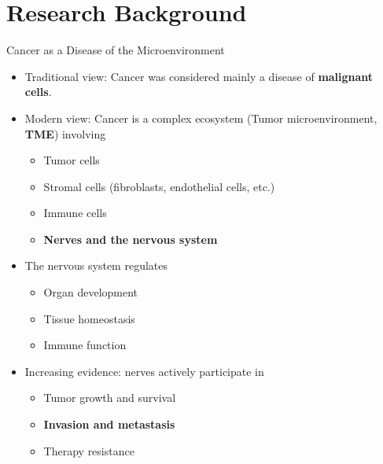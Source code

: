 \documentclass[10pt]{beamer}
\theoremstyle{plain}
\begin{document}
\section{Research Background}

\begin{frame}{Cancer as a Disease of the Microenvironment}
  \begin{itemize}
    \item Traditional view: Cancer was considered mainly a disease of \textbf{malignant cells}.
    \item Modern view: Cancer is a complex ecosystem (Tumor microenvironment, \textbf{TME}) involving
      \begin{itemize}
        \item Tumor cells
        \item Stromal cells (fibroblasts, endothelial cells, etc.)
        \item Immune cells
        \item \textbf{Nerves and the nervous system}
      \end{itemize}
    \item The nervous system regulates
      \begin{itemize}
        \item Organ development
        \item Tissue homeostasis
        \item Immune function
      \end{itemize}
    \item Increasing evidence: nerves actively participate in
      \begin{itemize}
        \item Tumor growth and survival
        \item \textbf{Invasion and metastasis}
        \item Therapy resistance
      \end{itemize}
  \end{itemize}
\end{frame}
\end{document}
